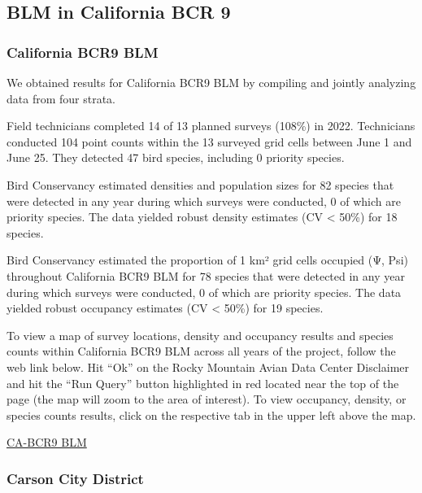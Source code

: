 \documentclass[
  letterpaper,
  DIV=11,
  numbers=noendperiod,
  oneside]{scrreprt}
\begin{document}
\hypertarget{blm-in-california-bcr-9}{%
\subsection{BLM in California BCR 9}\label{blm-in-california-bcr-9}}

\hypertarget{california-bcr9-blm}{%
\subsubsection{California BCR9 BLM}\label{california-bcr9-blm}}

We obtained results for California BCR9 BLM by compiling and jointly
analyzing data from four strata.

Field technicians completed 14 of 13 planned surveys (108\%) in 2022.
Technicians conducted 104 point counts within the 13 surveyed grid cells
between June 1 and June 25. They detected 47 bird species, including 0
priority species.

Bird Conservancy estimated densities and population sizes for 82 species
that were detected in any year during which surveys were conducted, 0 of
which are priority species. The data yielded robust density estimates
(CV \textless{} 50\%) for 18 species.

Bird Conservancy estimated the proportion of 1 km² grid cells occupied
(Ψ, Psi) throughout California BCR9 BLM for 78 species that were
detected in any year during which surveys were conducted, 0 of which are
priority species. The data yielded robust occupancy estimates (CV
\textless{} 50\%) for 19 species.

To view a map of survey locations, density and occupancy results and
species counts within California BCR9 BLM across all years of the
project, follow the web link below. Hit ``Ok'' on the Rocky Mountain
Avian Data Center Disclaimer and hit the ``Run Query'' button
highlighted in red located near the top of the page (the map will zoom
to the area of interest). To view occupancy, density, or species counts
results, click on the respective tab in the upper left above the map.

\href{http://www.rmbo.org/new_site/adc/QueryWindow.aspx\#N4IgzgrgDgpgTmALnAhoiBbEAuABCAYQEEBaAIQICUBOXMgGQFkQBfIA}{CA-BCR9
BLM}

\hypertarget{carson-city-district}{%
\subsubsection{Carson City District}\label{carson-city-district}}
\end{document}
